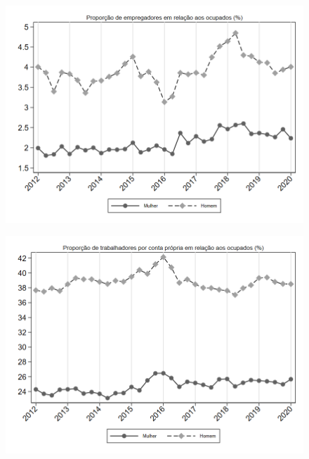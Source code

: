 \begin{frame}[label=_composicao_demografica_genero_prop_empregador]{}
\textit{\hyperlink{_composicao_demografica_genero}{}}
\begin{figure}
  \centering
  \includegraphics[width=1.0\linewidth]{../../analysis/output/composicao_demografica/genero/_composicao_demografica_genero_prop_empregador.png}
  \caption{}
  \label{fig:_composicao_demografica_genero_prop_empregador}
\end{figure}
\end{frame}



\begin{frame}[label=_composicao_demografica_genero_prop_cpropria]{}
\textit{\hyperlink{_composicao_demografica_genero}{}}
\begin{figure}
  \centering
  \includegraphics[width=1.0\linewidth]{../../analysis/output/composicao_demografica/genero/_composicao_demografica_genero_prop_cpropria.png}
  \caption{}
  \label{fig:_composicao_demografica_genero_prop_cpropria}
\end{figure}
\end{frame}

